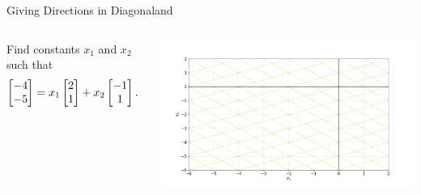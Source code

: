 \documentclass[xcolor=dvipsnames,aspectratio=169,t]{beamer}
\begin{document}
\begin{frame}{Giving Directions in Diagonaland}

  \begin{columns}[T]
    \column{0.4\tw}

    {\small
  \begin{example}

    Find constants $x_1$ and $x_2$ such that
    \[ \begin{bmatrix} -4 \\ -5 \end{bmatrix} = x_1 \begin{bmatrix} 2 \\ 1 \end{bmatrix} + x_2 \begin{bmatrix} -1 \\ 1 \end{bmatrix} .\]
\end{example} }

  \column{0.6\tw}

  \includegraphics[width=0.95\tw]{images/fig-span2.png}

  \end{columns}

  \vspace{2in}

  \end{frame}
\end{document}
